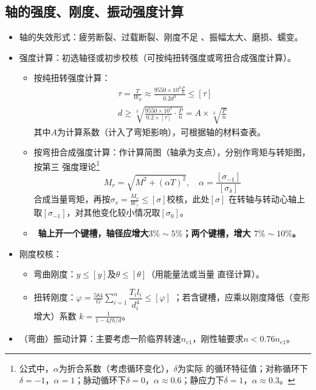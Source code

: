\documentclass[12pt,a4paper]{article}
\newcommand{\tightlist}{\setlength{\parskip}{0pt}\setlength{\itemsep}{0pt}}
\newcommand{\hint}[1]{\textsf{（#1）}}
\newcommand{\minor}[1]{{\color{gray} #1}}
\renewcommand{\emph}[1]{\faIcon[regular]{lightbulb}\ \textbf{#1}}
\begin{document}
\subsection{轴的强度、刚度、振动强度计算}
\begin{itemize}\tightlist
    \item 轴的失效形式：疲劳断裂、过载断裂、刚度不足\minor{、振幅太大、磨损、蠕变}。
    \item 强度计算：初选轴径或初步校核\hint{可按纯扭转强度或弯扭合成强度计算}。
    \begin{itemize}\tightlist
        \item 按纯扭转强度计算：
        \begin{gather}
        \tau=\frac{T}{W_p}\approx\frac{9550\times10^3\frac Pn}{0.2d^3}\leq[\tau]\\
        d\geq\sqrt[3]{\frac{9550\times10^3}{0.2\times[\tau]}\cdot\frac Pn}=A\times
        \sqrt[3]{\frac Pn}
        \end{gather}
        其中$A$为计算系数\hint{计入了弯矩影响}，可根据轴的材料查表。
        \item 按弯扭合成强度计算：作计算简图\hint{轴承为支点}，分别作弯矩与转矩图，按第三
        强度理论\footnote{公式中，$\alpha$为折合系数\hint{考虑循环变化}，$\delta$为实际
        的循环特征值；对称循环下$\delta=-1$，$\alpha=1$；脉动循环下$\delta=0$，$\alpha
        \approx0.6$；静应力下$\delta=1$，$\alpha\approx0.3$。}
        \begin{equation}
        M_v=\sqrt{M^2+(\alpha T)^2},\quad\alpha=\frac{[\sigma_{-1}]}{[\sigma_\delta]}
        \end{equation}
        合成当量弯矩，再按$\sigma_v=\frac{M_v}{W_z}\leq[\sigma]$校核，此处$[\sigma]$
        在转轴与转动心轴上取$[\sigma_{-1}]$，对其他变化较小情况取$[\sigma_0]$。
        \item \emph{轴上开一个键槽，轴径应增大$3\%\sim5\%$；两个键槽，增大
        $7\%\sim10\%$。}
    \end{itemize}
    \item 刚度校核：
    \begin{itemize}\tightlist
        \item \minor{弯曲刚度：$y\leq[y]$及$\theta\leq[\theta]$\hint{用能量法或当量
        直径计算}。}
        \item 扭转刚度：$\varphi=\frac{584}G\sum_{i=1}^n\dfrac{T_il_i}{d_i^4}\leq
        [\varphi]$\minor{；若含键槽，应乘以刚度降低\hint{变形增大}系数
        $k=\frac1{1-4fh/d}$}。
    \end{itemize}
    \item （弯曲）振动计算：主要考虑一阶临界转速$n_{e1}$，刚性轴要求$n<0.76n_{e1}$。
\end{itemize}
\end{document}
